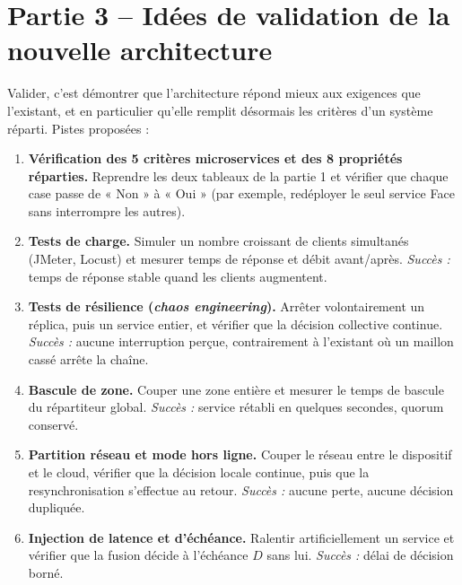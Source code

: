 \documentclass[11pt,a4paper]{article}
\begin{document}
\section{Partie 3 -- Idées de validation de la nouvelle architecture}

Valider, c'est démontrer que l'architecture répond mieux aux exigences que l'existant, et en particulier qu'elle remplit désormais les critères d'un système réparti. Pistes proposées :

\begin{enumerate}
    \item \textbf{Vérification des 5 critères microservices et des 8 propriétés réparties.} Reprendre les deux tableaux de la partie 1 et vérifier que chaque case passe de « Non » à « Oui » (par exemple, redéployer le seul service Face sans interrompre les autres). 

    \item \textbf{Tests de charge.} Simuler un nombre croissant de clients simultanés (JMeter, Locust) et mesurer temps de réponse et débit avant/après. \textit{Succès :} temps de réponse stable quand les clients augmentent.

    \item \textbf{Tests de résilience (\textit{chaos engineering}).} Arrêter volontairement un réplica, puis un service entier, et vérifier que la décision collective continue. \textit{Succès :} aucune interruption perçue, contrairement à l'existant où un maillon cassé arrête la chaîne.

    \item \textbf{Bascule de zone.} Couper une zone entière et mesurer le temps de bascule du répartiteur global. \textit{Succès :} service rétabli en quelques secondes, quorum conservé.

    \item \textbf{Partition réseau et mode hors ligne.} Couper le réseau entre le dispositif et le cloud, vérifier que la décision locale continue, puis que la resynchronisation s'effectue au retour. \textit{Succès :} aucune perte, aucune décision dupliquée.

    \item \textbf{Injection de latence et d'échéance.} Ralentir artificiellement un service et vérifier que la fusion décide à l'échéance $D$ sans lui. \textit{Succès :} délai de décision borné.


\end{enumerate}
\end{document}
